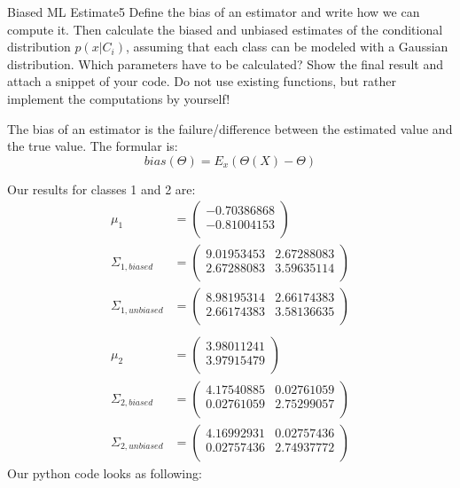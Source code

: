 \begin{questions}

\begin{question}{Biased ML Estimate}{5}
Define the bias of an estimator and write how we can compute it.
Then calculate the biased and unbiased estimates of the conditional distribution $p(x|C_i)$, assuming that each class can be modeled with a Gaussian distribution. Which parameters have to be calculated?
Show the final result and attach a snippet of your code.
Do not use existing functions, but rather implement the computations by yourself!

\begin{answer}
The bias of an estimator is the failure/difference between the estimated value and the true value. The formular is:
\[
	bias(\Theta )=E_x(\Theta (X)-\Theta )
\]

Our results for classes 1 and 2 are:
\begin{align*}
\mu_1 &= \begin{pmatrix} 
-0.70386868 \\
-0.81004153 \\
\end{pmatrix} \\
\Sigma_{1, biased} &= \begin{pmatrix}
9.01953453 & 2.67288083 \\
2.67288083& 3.59635114 \\
\end{pmatrix} \\
\Sigma_{1, unbiased} &= \begin{pmatrix}
8.98195314 & 2.66174383 \\
2.66174383 & 3.58136635 \\
\end{pmatrix} \\ \\
\mu_2 &= \begin{pmatrix} 
3.98011241 \\
3.97915479 \\
\end{pmatrix} \\
\Sigma_{2, biased} &= \begin{pmatrix}
4.17540885 & 0.02761059 \\
0.02761059 & 2.75299057 \\
\end{pmatrix} \\
\Sigma_{2, unbiased} &= \begin{pmatrix}
4.16992931 & 0.02757436 \\
0.02757436 & 2.74937772 \\
\end{pmatrix}
\end{align*}
Our python code looks as following:\\

\end{answer}


\end{question}
\end{questions}
